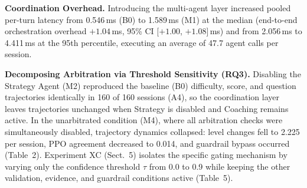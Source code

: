 \documentclass[runningheads]{llncs}
\begin{document}
\textbf{Coordination Overhead.} Introducing the multi-agent layer increased pooled per-turn latency from 0.546\,ms (B0) to 1.589\,ms (M1) at the median (end-to-end orchestration overhead $+1.04$\,ms, 95\% CI [$+1.00$, $+1.08$]\,ms) and from 2.056\,ms to 4.411\,ms at the 95th percentile, executing an average of 47.7 agent calls per session.

\textbf{Decomposing Arbitration via Threshold Sensitivity (RQ3).} Disabling the Strategy Agent (M2) reproduced the baseline (B0) difficulty, score, and question trajectories identically in 160 of 160 sessions (A4), so the coordination layer leaves trajectories unchanged when Strategy is disabled and Coaching remains active. In the unarbitrated condition (M4), where all arbitration checks were simultaneously disabled, trajectory dynamics collapsed: level changes fell to 2.225 per session, PPO agreement decreased to 0.014, and guardrail bypass occurred (Table~2). Experiment XC (Sect.~5) isolates the specific gating mechanism by varying only the confidence threshold $\tau$ from 0.0 to 0.9 while keeping the other validation, evidence, and guardrail conditions active (Table~5).

\begin{table}[t]
\caption{Registered predictions and empirical outcomes for Experiment XA.}
\label{tab:predictions}
\centering
{}
\end{table}
\end{document}
